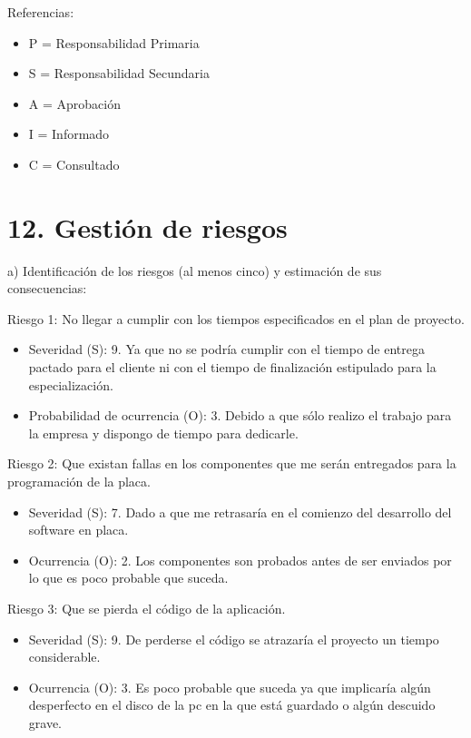 \documentclass[11pt]{charter}
\begin{document}
Referencias: 
\begin{itemize}


\item P = Responsabilidad Primaria 
\item S = Responsabilidad Secundaria 
\item A = Aprobación 
\item I = Informado 
\item C = Consultado 
\end{itemize}




\section{12. Gestión de riesgos}
\label{sec:riesgos}

a) Identificación de los riesgos (al menos cinco) y estimación de sus consecuencias:
 
Riesgo 1: No llegar a cumplir con los tiempos especificados en el plan de proyecto.
\begin{itemize}
\item Severidad (S): 9. Ya que no se podría cumplir con el tiempo de entrega pactado para el cliente ni con el tiempo de finalización estipulado para la especialización.
\item Probabilidad de ocurrencia (O): 3. Debido a que sólo realizo el trabajo para la empresa y dispongo de tiempo para dedicarle.
\end{itemize}   

Riesgo 2: Que existan fallas en los componentes que me serán entregados para la programación de la placa.
\begin{itemize}
\item Severidad (S): 7. Dado a que me retrasaría en el comienzo del desarrollo del software en placa. 
\item Ocurrencia (O): 2. Los componentes son probados antes de ser enviados por lo que es poco probable que suceda.
\end{itemize}

Riesgo 3: Que se pierda el código de la aplicación.
\begin{itemize}
\item Severidad (S): 9. De perderse el código se atrazaría el proyecto un tiempo considerable.
\item Ocurrencia (O): 3. Es poco probable que suceda ya que implicaría algún desperfecto en el disco de la pc en la que está guardado o algún descuido grave.
\end{itemize}
\end{document}
